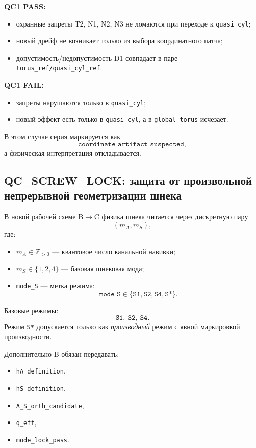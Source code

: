 \textbf{QC1 PASS:}
\begin{itemize}
\item охранные запреты T2, N1, N2, N3 не ломаются при переходе к \texttt{quasi\_cyl};
\item новый дрейф не возникает только из выбора координатного патча;
\item допустимость/недопустимость D1 совпадает в паре \texttt{torus\_ref/quasi\_cyl\_ref}.
\end{itemize}

\textbf{QC1 FAIL:}
\begin{itemize}
\item запреты нарушаются только в \texttt{quasi\_cyl};
\item новый эффект есть только в \texttt{quasi\_cyl}, а в \texttt{global\_torus} исчезает.
\end{itemize}

В этом случае серия маркируется как
\[
\texttt{coordinate\_artifact\_suspected},
\]
а физическая интерпретация откладывается.

\subsection{QC\_SCREW\_LOCK: защита от произвольной непрерывной геометризации шнека}

В новой рабочей схеме B$\to$C физика шнека читается через дискретную пару
\[
(m_A,m_S),
\]
где:
\begin{itemize}
\item $m_A\in \mathbb{Z}_{>0}$ --- квантовое число канальной навивки;
\item $m_S\in\{1,2,4\}$ --- базовая шнековая мода;
\item \texttt{mode\_S} --- метка режима:
\[
\texttt{mode\_S}\in\{\texttt{S1},\texttt{S2},\texttt{S4},\texttt{S*}\}.
\]
\end{itemize}

Базовые режимы:
\[
\texttt{S1},\ \texttt{S2},\ \texttt{S4}.
\]
Режим \texttt{S*} допускается только как \emph{производный} режим с явной маркировкой производности.

Дополнительно B обязан передавать:
\begin{itemize}
\item \texttt{hA\_definition},
\item \texttt{hS\_definition},
\item \texttt{A\_S\_orth\_candidate},
\item \texttt{q\_eff},
\item \texttt{mode\_lock\_pass}.
\end{itemize}

